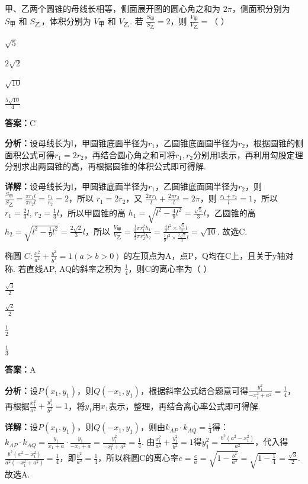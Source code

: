 \begin{question}[points=5]
甲、乙两个圆锥的母线长相等，侧面展开图的圆心角之和为 $2\pi$，侧面积分别为 $S_\text{甲}$ 和 $S_\text{乙}$，体积分别为 $V_\text{甲}$ 和 $V_\text{乙}$. 若 $\frac{S_\text{甲}}{S_\text{乙}}=2$，则 $\frac{V_\text{甲}}{V_\text{乙}}=$（ ）
\begin{choices}
  \item $\sqrt{5}$
  \item $2\sqrt{2}$
  \item $\sqrt{10}$
  \item $\frac{5\sqrt{10}}{4}$
\end{choices}
\begin{solution}
\textbf{答案：}C

\textbf{分析：}设母线长为l，甲圆锥底面半径为$r_1$，乙圆锥底面圆半径为$r_2$，根据圆锥的侧面积公式可得$r_1=2r_2$，再结合圆心角之和可将$r_1,r_2$分别用l表示，再利用勾股定理分别求出两圆锥的高，再根据圆锥的体积公式即可得解.

\textbf{详解：}设母线长为l，甲圆锥底面半径为$r_1$，乙圆锥底面圆半径为$r_2$，则 $\frac{S_\text{甲}}{S_\text{乙}}=\frac{\pi r_1 l}{\pi r_2 l}=\frac{r_1}{r_2}=2$，所以 $r_1=2r_2$，又 $\frac{2\pi r_1}{l}+\frac{2\pi r_2}{l}=2\pi$，则 $\frac{r_1+r_2}{l}=1$，所以 $r_1=\frac{2}{3}l$, $r_2=\frac{1}{3}l$，所以甲圆锥的高 $h_1=\sqrt{l^2-\frac{4}{9}l^2}=\frac{\sqrt{5}}{3}l$，乙圆锥的高 $h_2=\sqrt{l^2-\frac{1}{9}l^2}=\frac{2\sqrt{2}}{3}l$，所以 $\frac{V_\text{甲}}{V_\text{乙}}=\frac{\frac{1}{3}\pi r_1^2 h_1}{\frac{1}{3}\pi r_2^2 h_2}=\frac{\frac{4}{9}l^2 \times \frac{\sqrt{5}}{3}l}{\frac{1}{9}l^2 \times \frac{2\sqrt{2}}{3}l}=\sqrt{10}$. 故选C.
\end{solution}
\end{question}

\begin{question}[points=5]
椭圆 $C:\frac{x^2}{a^2}+\frac{y^2}{b^2}=1(a>b>0)$ 的左顶点为A，点P，Q均在C上，且关于y轴对称. 若直线AP, AQ的斜率之积为 $\frac{1}{4}$，则C的离心率为（ ）
\begin{choices}
  \item $\frac{\sqrt{3}}{2}$
  \item $\frac{\sqrt{2}}{2}$
  \item $\frac{1}{2}$
  \item $\frac{1}{3}$
\end{choices}
\begin{solution}
\textbf{答案：}A

\textbf{分析：}设$P(x_1,y_1)$，则$Q(-x_1,y_1)$，根据斜率公式结合题意可得$\frac{y_1^2}{-x_1^2+a^2}=\frac{1}{4}$，再根据$\frac{x_1^2}{a^2}+\frac{y_1^2}{b^2}=1$，将$y_1$用$x_1$表示，整理，再结合离心率公式即可得解.

\textbf{详解：}设$P(x_1,y_1)$，则$Q(-x_1,y_1)$，则由$k_{AP}\cdot k_{AQ}=\frac{1}{4}$得：$k_{AP}\cdot k_{AQ}=\frac{y_1}{x_1+a}\cdot\frac{y_1}{-x_1+a}=\frac{y_1^2}{-x_1^2+a^2}=\frac{1}{4}$. 由$\frac{x_1^2}{a^2}+\frac{y_1^2}{b^2}=1$得$y_1^2=\frac{b^2(a^2-x_1^2)}{a^2}$，代入得$\frac{b^2(a^2-x_1^2)}{a^2(-x_1^2+a^2)}=\frac{1}{4}$，即$\frac{b^2}{a^2}=\frac{1}{4}$，所以椭圆C的离心率$e=\frac{c}{a}=\sqrt{1-\frac{b^2}{a^2}}=\sqrt{1-\frac{1}{4}}=\frac{\sqrt{3}}{2}$. 故选A.
\end{solution}
\end{question}

